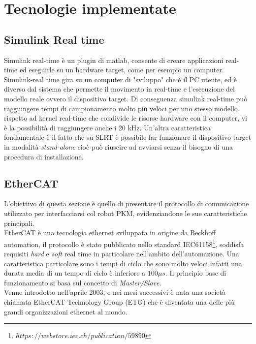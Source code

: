 \section{Tecnologie implementate}
\subsection{Simulink Real time}
Simulink real-time è un plugin di matlab, consente di creare applicazioni real-time ed eseguirle su un hardware target, come per esempio un computer. Simulink-real time gira su un computer di "sviluppo" che è il PC utente, ed è diverso dal sistema che permette il movimento in real-time e l'esecuzione del modello reale ovvero il dispositivo target. Di conseguenza simulink real-time può raggiungere tempi di campionamento molto più veloci per uno stesso modello rispetto ad kernel real-time che condivide le risorse hardware con il computer, vi è la possibilità di raggiungere anche i 20 kHz. 
Un'altra caratteristica fondamentale è il fatto che su SLRT è possibile far funzionare il dispositivo target in modalità \textit{stand-alone} cioè può riuscire ad avviarsi senza il bisogno di una procedura di installazione. 

\subsection{EtherCAT}
L'obiettivo di questa sezione è quello di presentare il protocollo di comunicazione utilizzato per interfacciarsi col robot PKM, evidenziandone le sue caratteristiche principali.\\
EtherCAT è una tecnologia ethernet sviluppata in origine da Beckhoff automation, il protocollo è stato pubblicato nello standard IEC61158\footnote{${https://webstore.iec.ch/publication/59890}$}, soddisfa requisiti \textit{hard} e \textit{soft} real time in particolare nell'ambito dell'automazione. Una caratteristica particolare sono i tempi di ciclo che sono molto veloci infatti una durata media di un tempo di ciclo è inferiore a $100 \mu s$. Il principio base di funzionamento si basa sul concetto di \textit{Master/Slave}.
\\Venne introdotto nell'aprile 2003, e nei mesi successivi è nata una società chiamata EtherCAT Technology Group (ETG) che è diventata una delle più grandi organizzazioni ethernet al mondo.
